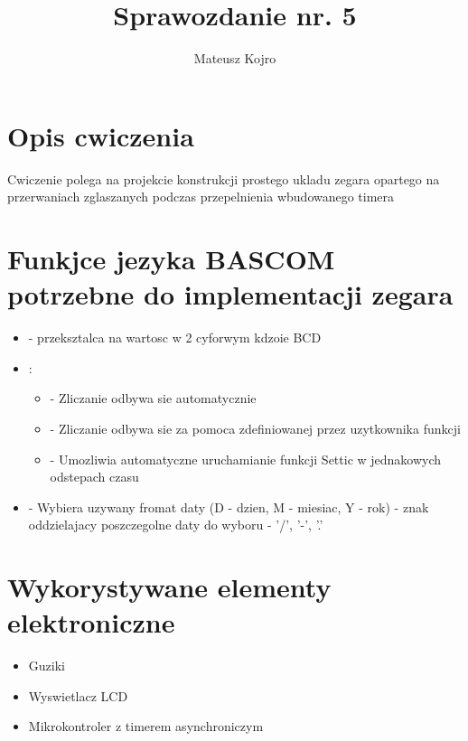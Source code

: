 \documentclass{article}
\title{Sprawozdanie nr. 5}
\author{Mateusz Kojro}
\date{}
\begin{document}
\maketitle

\section{Opis cwiczenia}

Cwiczenie polega na projekcie konstrukcji prostego ukladu zegara opartego na 
przerwaniach zglaszanych podczas przepelnienia wbudowanego timera 

\section{Funkjce jezyka BASCOM potrzebne do implementacji zegara}

\begin{itemize}
  \item {} - przeksztalca  na wartosc w 2 cyforwym kdzoie BCD
  \item {}: 
    \begin{itemize}
      \item {} - Zliczanie odbywa sie automatycznie
      \item {} - Zliczanie odbywa sie za pomoca zdefiniowanej przez uzytkownika funkcji
      \item {} - Umozliwia automatyczne uruchamianie funkcji Settic w jednakowych odstepach czasu
    \end{itemize}
  \item {} - Wybiera uzywany fromat daty (D - dzien, M - miesiac, Y - rok)
   - znak oddzielajacy poszczegolne daty do wyboru - '/', '-', '.' 
\end{itemize}

\section{Wykorystywane elementy elektroniczne}
\begin{itemize}
  \item Guziki
  \item Wyswietlacz LCD
  \item Mikrokontroler z timerem asynchroniczym
\end{itemize}
\end{document}
